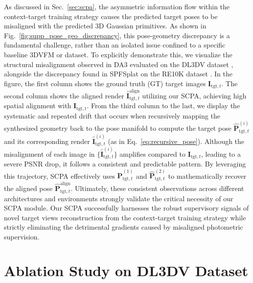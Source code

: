 As discussed in Sec.~\ref{sec:scpa}, the asymmetric information flow within the context-target training strategy causes the predicted target poses to be misaligned with the predicted 3D Gaussian primitives. 
As shown in Fig.~\ref{fig:supp_pose_geo_discrepancy}, this pose-geometry discrepancy is a fundamental challenge, rather than an isolated issue confined to a specific baseline 3DVFM or dataset. 
To explicitly demonstrate this, we visualize the structural misalignment observed in DA3 \cite{lin2025da3} evaluated on the DL3DV dataset \cite{ling2024dl3dv}, alongside the discrepancy found in SPFSplat \cite{huang2025no} on the RE10K dataset \cite{zhou2018stereo}. 
In the figure, the first column shows the ground truth (GT) target images $\bm{I}_{\text{tgt}, t}$. 
The second column shows the aligned render $\hat{\bm{I}}^{\text{align}}_{\text{tgt}, t}$ utilizing our SCPA, achieving high spatial alignment with $\bm{I}_{\text{tgt}, t}$. 
From the third column to the last, we display the systematic and repeated drift that occurs when recursively mapping the synthesized geometry back to the pose manifold to compute the target pose $\hat{\bm{P}}^{(i)}_{\text{tgt}, t}$ and its corresponding render $\hat{\bm{I}}^{(i)}_{\text{tgt}, t}$ (as in Eq.~\ref{eq:recursive_pose}). Although the misalignment of each image in $\{\hat{\bm{I}}^{(i)}_{\text{tgt}, t}\}$ amplifies compared to $\bm{I}_{\text{tgt}, t}$, leading to a severe PSNR drop, it follows a consistent and predictable pattern. 
By leveraging this trajectory, SCPA effectively uses $\hat{\bm{P}}^{(1)}_{\text{tgt}, t}$ and $\hat{\bm{P}}^{(2)}_{\text{tgt}, t}$ to mathematically recover the aligned pose $\hat{\bm{P}}^{\text{align}}_{\text{tgt}, t}$. 
Ultimately, these consistent observations across different architectures and environments strongly validate the critical necessity of our SCPA module. 
Our SCPA successfully harnesses the robust supervisory signals of novel target views reconstruction from the context-target training strategy while strictly eliminating the detrimental gradients caused by misaligned photometric supervision.


\section{Ablation Study on DL3DV Dataset}
\label{sec:supp_ablation_study}

